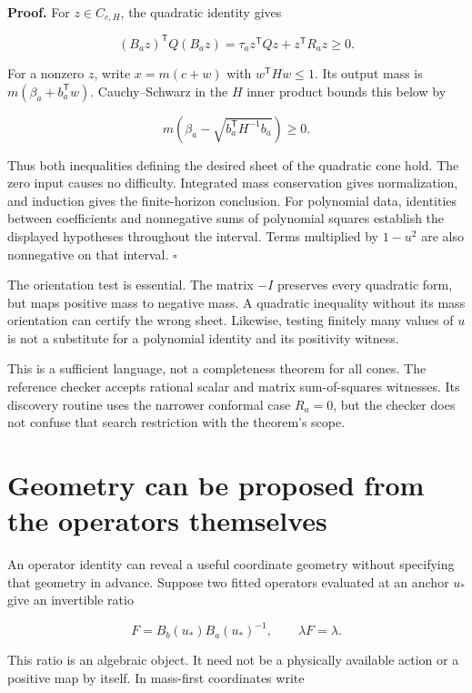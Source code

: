 \textbf{Proof.} For \(z\in C_{c,H}\), the quadratic identity gives

\[
(B_a z)^{\mathsf T}Q(B_a z)
=\tau_a z^{\mathsf T}Qz+z^{\mathsf T}R_a z\geq0.
\]

For a nonzero \(z\), write \(x=m(c+w)\) with \(w^{\mathsf T}Hw\leq1\).
Its output mass is \(m(\beta_a+b_a^{\mathsf T}w)\). Cauchy--Schwarz in
the \(H\) inner product bounds this below by

\[
m\left(\beta_a-\sqrt{b_a^{\mathsf T}H^{-1}b_a}\right)\geq0.
\]

Thus both inequalities defining the desired sheet of the quadratic cone
hold. The zero input causes no difficulty. Integrated mass conservation
gives normalization, and induction gives the finite-horizon conclusion.
For polynomial data, identities between coefficients and nonnegative
sums of polynomial squares establish the displayed hypotheses throughout
the interval. Terms multiplied by \(1-u^2\) are also nonnegative on that
interval. \(\square\)

The orientation test is essential. The matrix \(-I\) preserves every
quadratic form, but maps positive mass to negative mass. A quadratic
inequality without its mass orientation can certify the wrong sheet.
Likewise, testing finitely many values of \(u\) is not a substitute for
a polynomial identity and its positivity witness.

This is a sufficient language, not a completeness theorem for all cones.
The reference checker accepts rational scalar and matrix sum-of-squares
witnesses. Its discovery routine uses the narrower conformal case
\(R_a=0\), but the checker does not confuse that search restriction with
the theorem's scope.

\section{Geometry can be proposed from the operators themselves}\label{LSM:geometry-can-be-proposed-from-the-operators-themselves}

An operator identity can reveal a useful coordinate geometry without
specifying that geometry in advance. Suppose two fitted operators
evaluated at an anchor \(u_*\) give an invertible ratio

\[
F=B_b(u_*)B_a(u_*)^{-1},\qquad \lambda F=\lambda.
\]

This ratio is an algebraic object. It need not be a physically available
action or a positive map by itself. In mass-first coordinates write

